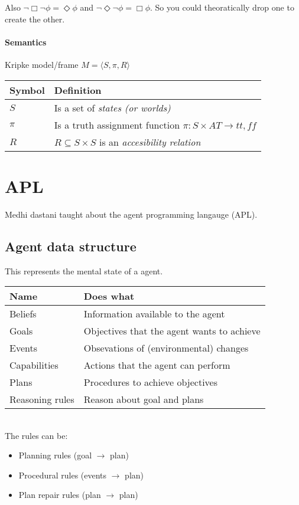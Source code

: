 \documentclass{article}
\begin{document}
\noindent
Also $\neg\Box\neg\phi = \Diamond\phi$ and
$\neg\Diamond\neg\phi = \Box\phi$. So you could theoratically
drop one to create the other.

\paragraph{Semantics} Kripke %
model/frame $M=\langle S,\pi,R \rangle$

\begin{tabular}{ll}
	Symbol & Definition \\ \toprule
	$S$ & Is a set of \emph{states (or worlds)} \\
	$\pi$ & Is a truth assignment function $\pi : S \times AT \to {tt, ff}$ \\
	$R$	& $R \subseteq S \times S$ is an \emph{accesibility relation}
\end{tabular}


\section{APL}
Medhi dastani taught about the agent programming langauge (APL).
\subsection{Agent data structure}
This represents the mental state of a agent. \\
\begin{tabular}{ll}
	Name & Does what \\ \toprule
	Beliefs & Information available to the agent \\
	Goals & Objectives that the agent wants to achieve \\
	Events & Obsevations of (environmental) changes \\
	Capabilities & Actions that the agent can perform \\
	Plans & Procedures to achieve objectives \\
	Reasoning rules & Reason about goal and plans \\
\end{tabular} \\

\noindent
The rules can be:

\begin{itemize}
	\item Planning rules (goal $\to$ plan)
	\item Procedural rules (events $\to$ plan)
	\item Plan repair rules (plan $\to$ plan)
\end{itemize}
\end{document}
